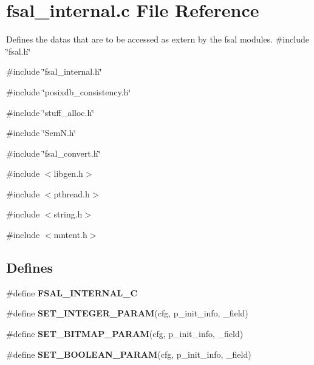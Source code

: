 \section{fsal\_\-internal.c File Reference}
\label{fsal__internal_8c}


Defines the datas that are to be accessed as extern by the fsal modules.  
{\ttfamily \#include \char`\"{}fsal.h\char`\"{}}\par
{\ttfamily \#include \char`\"{}fsal\_\-internal.h\char`\"{}}\par
{\ttfamily \#include \char`\"{}posixdb\_\-consistency.h\char`\"{}}\par
{\ttfamily \#include \char`\"{}stuff\_\-alloc.h\char`\"{}}\par
{\ttfamily \#include \char`\"{}SemN.h\char`\"{}}\par
{\ttfamily \#include \char`\"{}fsal\_\-convert.h\char`\"{}}\par
{\ttfamily \#include $<$libgen.h$>$}\par
{\ttfamily \#include $<$pthread.h$>$}\par
{\ttfamily \#include $<$string.h$>$}\par
{\ttfamily \#include $<$mntent.h$>$}\par
\subsection*{Defines}
\begin{DoxyCompactItemize}
\item 
\#define {\bfseries FSAL\_\-INTERNAL\_\-C}\label{fsal__internal_8c_acfa63689895f5e17e205bd65f0178c0d}

\item 
\#define {\bfseries SET\_\-INTEGER\_\-PARAM}(cfg, p\_\-init\_\-info, \_\-field)
\item 
\#define {\bfseries SET\_\-BITMAP\_\-PARAM}(cfg, p\_\-init\_\-info, \_\-field)
\item 
\#define {\bfseries SET\_\-BOOLEAN\_\-PARAM}(cfg, p\_\-init\_\-info, \_\-field)
\end{DoxyCompactItemize}
